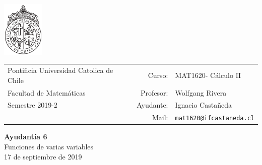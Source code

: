 \documentclass[12pt]{article}
\makeatletter
\newcommand{\ayudantia}{{\sc Ayudantía 6}}
\newcommand{\tituloayu}{Funciones de varias variables}
\newcommand{\fecha}{17 de septiembre de 2019}
\newcommand{\sigla}{MAT1620}
\newcommand{\nombre}{Cálculo II}
\newcommand{\profesor}{Wolfgang Rivera}
\newcommand{\ano}{2019}
\newcommand{\semestre}{2}
\newcommand{\mail}{mat1620@ifcastaneda.cl}
\makeatother
\begin{document}
\thispagestyle{empty}

\begin{minipage}{2cm}
	\includegraphics[width=2cm]{../../../../img/logo.pdf}
	\vspace{0.5cm}
\end{minipage}
\begin{minipage}{\linewidth}
	\begin{tabular}{lrl}
		{\scriptsize\sc Pontificia Universidad Catolica de Chile} & \hspace*{0.7in}Curso: &
		\sigla  - \nombre\\
		{\sc Facultad de Matemáticas}&
		Profesor: & \profesor \\
		{\sc Semestre \ano-\semestre} & Ayudante: & {Ignacio Castañeda}\\
		& {Mail:} & \texttt{\mail}
	\end{tabular}
\end{minipage}

\vspace{-10mm}
\begin{center}
	{\LARGE\bf \ayudantia}\\
	\vspace{0.1cm}
	{\tituloayu}\\
	\vspace{0.1cm}
	\fecha\\
	\vspace{0.4cm}
\end{center}
\end{document}
